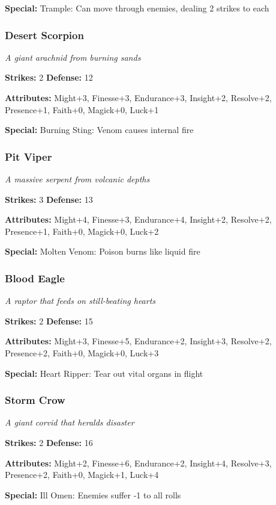 \documentclass[10pt,twoside]{article}
\begin{document}
\textbf{Special:} Trample: Can move through enemies, dealing 2 strikes to each

\subsubsection{Desert Scorpion}
\textit{A giant arachnid from burning sands}

\textbf{Strikes:} 2 \quad \textbf{Defense:} 12

\textbf{Attributes:} Might+3, Finesse+3, Endurance+3, Insight+2, Resolve+2, Presence+1, Faith+0, Magick+0, Luck+1

\textbf{Special:} Burning Sting: Venom causes internal fire

\subsubsection{Pit Viper}
\textit{A massive serpent from volcanic depths}

\textbf{Strikes:} 3 \quad \textbf{Defense:} 13

\textbf{Attributes:} Might+4, Finesse+3, Endurance+4, Insight+2, Resolve+2, Presence+1, Faith+0, Magick+0, Luck+2

\textbf{Special:} Molten Venom: Poison burns like liquid fire

\subsubsection{Blood Eagle}
\textit{A raptor that feeds on still-beating hearts}

\textbf{Strikes:} 2 \quad \textbf{Defense:} 15

\textbf{Attributes:} Might+3, Finesse+5, Endurance+2, Insight+3, Resolve+2, Presence+2, Faith+0, Magick+0, Luck+3

\textbf{Special:} Heart Ripper: Tear out vital organs in flight

\subsubsection{Storm Crow}
\textit{A giant corvid that heralds disaster}

\textbf{Strikes:} 2 \quad \textbf{Defense:} 16

\textbf{Attributes:} Might+2, Finesse+6, Endurance+2, Insight+4, Resolve+3, Presence+2, Faith+0, Magick+1, Luck+4

\textbf{Special:} Ill Omen: Enemies suffer -1 to all rolls
\end{document}

